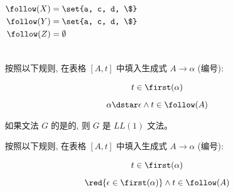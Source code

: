 \begin{frame}{}
  \begin{columns}
      
      \pause
      \begin{align*}
        \follow(X) &= \set{a, c, d, \$} \\
        \follow(Y) &= \set{a, c, d, \$} \\
        \follow(Z) &= \emptyset
      \end{align*}
  \end{columns}
\end{frame}

\begin{frame}{}
  \begin{center}

    \vspace{0.80cm}
    按照以下规则, 在表格 $[A, t]$ 中填入生成式 $A \to \alpha$ (编号):

    \begin{gather}
      t \in \first(\alpha) \\[6pt]
      \alpha \dstar \epsilon \land t \in \follow(A)
    \end{gather}

    \pause
    \begin{definition}[$LL(1)$文法]
      如果文法 $G$ 的是的,
      则 $G$ 是 $LL(1)$ 文法。
    \end{definition}
  \end{center}
\end{frame}

\begin{frame}{}
  \begin{center}
    按照以下规则, 在表格 $[A, t]$ 中填入生成式 $A \to \alpha$ (编号):

    \setcounter{equation}{0}
    \begin{gather}
      t \in \first(\alpha) \\[6pt]
      \red{\epsilon \in \first(\alpha)} \land t \in \follow(A)
    \end{gather}

    \vspace{0.60cm}
  \end{center}
\end{frame}

